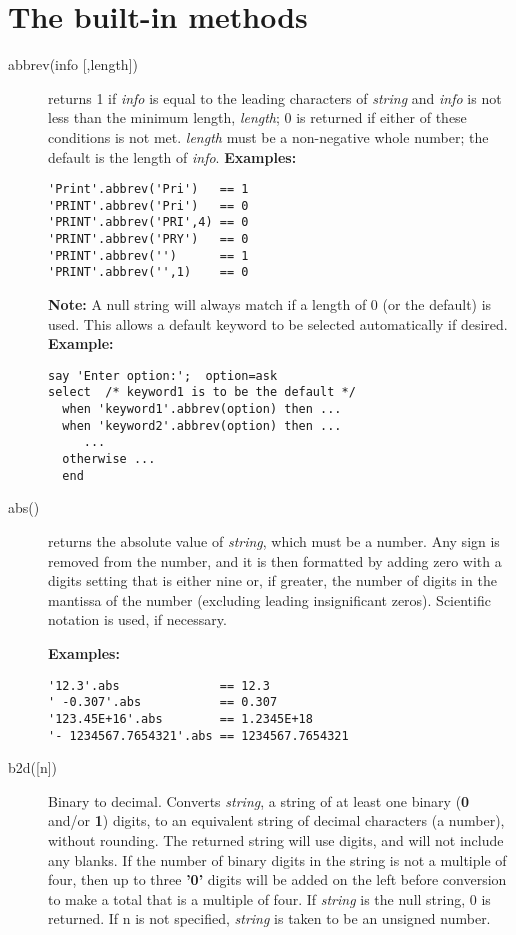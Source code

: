 \section{The built-in methods}\label{builtinmethods}
\begin{description}
\item[abbrev(info [,length{]})]\label{refabbrev}
returns 1 if \emph{info} is equal to the leading characters of
\emph{string} and \emph{info} is not less than
the minimum length, \emph{length}; 0 is returned
if either of these conditions is not met.
\emph{length} must be a non-negative whole number; the default is
the length of \emph{info}.
 \textbf{Examples:}
\begin{lstlisting}
'Print'.abbrev('Pri')   == 1
'PRINT'.abbrev('Pri')   == 0
'PRINT'.abbrev('PRI',4) == 0
'PRINT'.abbrev('PRY')   == 0
'PRINT'.abbrev('')      == 1
'PRINT'.abbrev('',1)    == 0
\end{lstlisting}
\textbf{Note: }A null string will always match if a length of 0 (or the default)
is used.
This allows a default keyword to be selected automatically if desired.
 \textbf{Example:}
\begin{lstlisting}
say 'Enter option:';  option=ask
select  /* keyword1 is to be the default */
  when 'keyword1'.abbrev(option) then ...
  when 'keyword2'.abbrev(option) then ...
     ...
  otherwise ...
  end
\end{lstlisting}
\item[abs()]\label{refabs}
returns the absolute value of \emph{string}, which must be a
number.
 Any sign is removed from the number, and it is then formatted by adding
zero with a digits setting that is either nine or, if greater, the
number of digits in the mantissa of the number (excluding leading
insignificant zeros).
Scientific notation is used, if necessary.
 
\textbf{Examples:}
\begin{lstlisting}
'12.3'.abs              == 12.3
' -0.307'.abs           == 0.307
'123.45E+16'.abs        == 1.2345E+18
'- 1234567.7654321'.abs == 1234567.7654321
\end{lstlisting}

\item[b2d([n{]})]\label{refb2x}
 Binary to decimal.
Converts \emph{string}, a string of at least one binary
(\textbf{0} and/or \textbf{1}) digits, to an equivalent string of
decimal characters (a number), without rounding.
The returned string will use digits,
and will not include any blanks.
 If the number of binary digits in the string is not a multiple of four,
then up to three \textbf{'0'} digits will be added on the left before
conversion to make a total that is a multiple of four.
 If \emph{string} is the null string, 0 is returned. If n is not specified, \emph{string} is taken to be an unsigned number.


\end{description}
